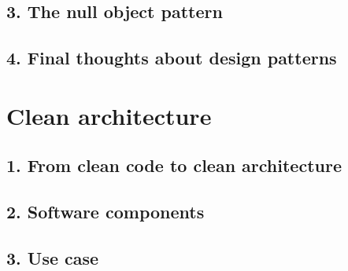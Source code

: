 \documentclass[a4paper,10pt,english]{sphinxmanual}
\begin{document}
\section{3. The null object pattern}
\label{\detokenize{chapters/9_design_patterns/index:the-null-object-pattern}}

\section{4. Final thoughts about design patterns}
\label{\detokenize{chapters/9_design_patterns/index:final-thoughts-about-design-patterns}}

\chapter{Clean architecture}
\label{\detokenize{chapters/10_clean_architecture/index:clean-architecture}}\label{\detokenize{chapters/10_clean_architecture/index::doc}}

\section{1. From clean code to clean architecture}
\label{\detokenize{chapters/10_clean_architecture/index:from-clean-code-to-clean-architecture}}

\section{2. Software components}
\label{\detokenize{chapters/10_clean_architecture/index:software-components}}

\section{3. Use case}
\label{\detokenize{chapters/10_clean_architecture/index:use-case}}


\renewcommand{\indexname}{Index}
\printindex
\end{document}
